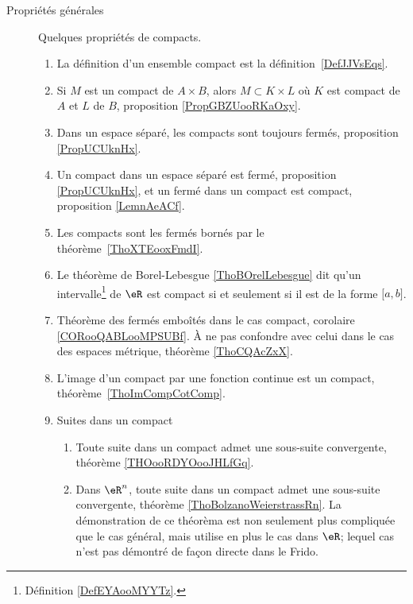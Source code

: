         \label{THEMEooQQBHooLcqoKB}
    \begin{description}

        \item[Propriétés générales]

            Quelques propriétés de compacts.

                \begin{enumerate}
    \item
        La définition d'un ensemble compact est la définition~\ref{DefJJVsEqs}.
    \item
        Si \( M\) est un compact de \( A\times B\), alors \( M\subset K\times L\) où \( K\) est compact de \( A\) et \( L\) de \( B\), proposition \ref{PropGBZUooRKaOxy}.
    \item
        Dans un espace séparé, les compacts sont toujours fermés, proposition \ref{PropUCUknHx}.
    \item
        Un compact dans un espace séparé est fermé, proposition \ref{PropUCUknHx}, et un fermé dans un compact est compact, proposition \ref{LemnAeACf}.
    \item
        Les compacts sont les fermés bornés par le théorème~\ref{ThoXTEooxFmdI}.
    \item
        Le théorème de Borel-Lebesgue \ref{ThoBOrelLebesgue} dit qu'un intervalle\footnote{Définition \ref{DefEYAooMYYTz}.} de \( \eR\) est compact si et seulement si il est de la forme \( \mathopen[ a , b \mathclose]\).
    \item
        Théorème des fermés emboîtés dans le cas compact, corolaire \ref{CORooQABLooMPSUBf}. À ne pas confondre avec celui dans le cas des espaces métrique, théorème \ref{ThoCQAcZxX}.
    \item
        L'image d'un compact par une fonction continue est un compact, théorème~\ref{ThoImCompCotComp}.
    \item
        Suites dans un compact
        \begin{enumerate}
            \item
                Toute suite dans un compact admet une sous-suite convergente, théorème \ref{THOooRDYOooJHLfGq}.
            \item
                Dans \( \eR^n\), toute suite dans un compact admet une sous-suite convergente, théorème \ref{ThoBolzanoWeierstrassRn}. La démonstration de ce théorèma est non seulement plus compliquée que le cas général, mais utilise en plus le cas dans \( \eR\); lequel cas n'est pas démontré de façon directe dans le Frido.

\end{enumerate}
\end{enumerate}
\end{description}
